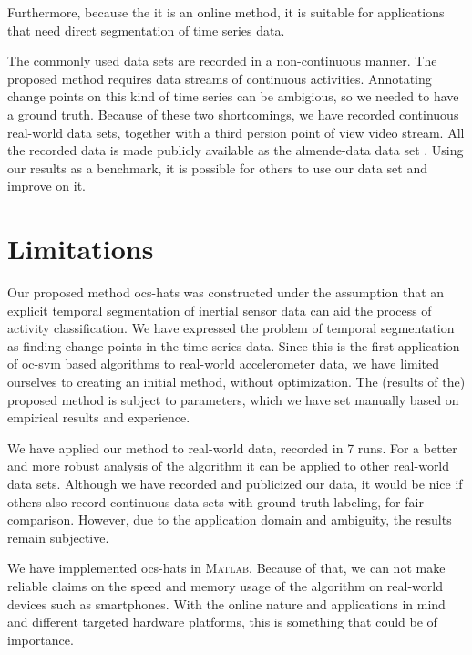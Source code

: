 Furthermore, because the it is an online method, it is suitable for applications that need direct segmentation of time series data.

The commonly used data sets \cite{kwapisz2011activity,anguita2012human} are recorded in a non-continuous manner.
The proposed method requires data streams of continuous activities.
Annotating change points on this kind of time series can be ambigious, so we needed to have a ground truth.
Because of these two shortcomings, we have recorded continuous real-world data sets, together with a third persion point of view video stream.
All the recorded data is made publicly available as the \gls{almende-data} data set \cite{vlasveld2014acras}.
Using our results as a benchmark, it is possible for others to use our data set and improve on it.

\section{Limitations}\label{sec:limitations}
Our proposed method \gls{ocs-hats} was constructed under the assumption that an explicit temporal segmentation of inertial sensor data can aid the process of activity classification.
We have expressed the problem of temporal segmentation as finding change points in the time series data.
Since this is the first application of \gls{oc-svm} based algorithms to real-world accelerometer data, we have limited ourselves to creating an initial method, without optimization.
The (results of the) proposed method is subject to parameters, which we have set manually based on empirical results and experience.

We have applied our method to real-world data, recorded in 7 runs.
For a better and more robust analysis of the algorithm it can be applied to other real-world data sets.
Although we have recorded and publicized our data, it would be nice if others also record continuous data sets with ground truth labeling, for fair comparison.
However, due to the application domain and ambiguity, the results remain subjective.

We have impplemented \gls{ocs-hats} in \textsc{Matlab}.
Because of that, we can not make reliable claims on the speed and memory usage of the algorithm on real-world devices such as smartphones.
With the online nature and applications in mind and different targeted hardware platforms, this is something that could be of importance.


